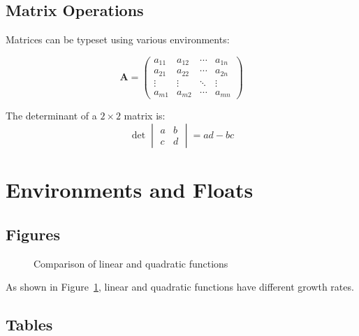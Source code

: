 \documentclass[12pt,a4paper]{article}
\renewcommand{\vec}[1]{\mathbf{#1}}
\theoremstyle{definition}
\theoremstyle{remark}
\begin{document}
\subsection{Matrix Operations}

Matrices can be typeset using various environments:

\begin{equation}
    \vec{A} = \begin{pmatrix}
        a_{11} & a_{12} & \cdots & a_{1n} \\
        a_{21} & a_{22} & \cdots & a_{2n} \\
        \vdots & \vdots & \ddots & \vdots \\
        a_{m1} & a_{m2} & \cdots & a_{mn}
    \end{pmatrix}
\end{equation}

The determinant of a $2 \times 2$ matrix is:
\[
    \det\begin{vmatrix}
        a & b \\
        c & d
    \end{vmatrix} = ad - bc
\]

\section{Environments and Floats}

\subsection{Figures}

\begin{figure}[htbp]
    \centering
    \caption{Comparison of linear and quadratic functions}
    \label{fig:functions}
\end{figure}

As shown in Figure~\ref{fig:functions}, linear and quadratic functions have different growth rates.

\subsection{Tables}
\end{document}
